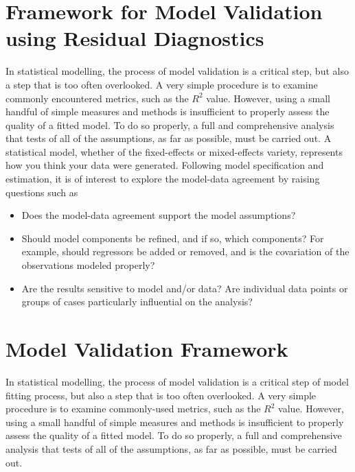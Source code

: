 \documentclass[12pt, a4paper]{article}
\begin{document}
			\section{Framework for Model Validation using Residual Diagnostics}
			In statistical modelling, the process of model validation is a critical step, but also a step that is too often overlooked. A very simple procedure is to examine commonly encountered
			metrics, such as the $R^2$ value. However, using a small handful of simple measures and methods is insufficient to properly assess the quality of a fitted model. To do so properly, a full and comprehensive
			analysis that tests of all of the assumptions, as far as possible, must be carried out. A statistical model, whether of the fixed-effects or mixed-effects variety, represents how you think your data
			were generated. Following model specification and estimation, it is of interest to explore the model-data
			agreement by raising questions such as
			\begin{itemize}
				\item Does the model-data agreement support the model assumptions?
				\item Should model components be refined, and if so, which components? For example, should regressors
				be added or removed, and is the covariation of the observations modeled properly?
				\item Are the results sensitive to model and/or data? Are individual data points or groups of cases particularly
				influential on the analysis?
			\end{itemize}
			\section{Model Validation Framework}
			In statistical modelling, the process of model validation is a critical step of model fitting process, but also a step that is too often overlooked. A very simple procedure is to examine commonly-used
			metrics, such as the $R^2$ value. However, using a small handful of simple measures and methods is insufficient to properly assess the quality of a fitted model. To do so properly, a full and comprehensive
			analysis that tests of all of the assumptions, as far as possible, must be carried out.
			
\end{document}
